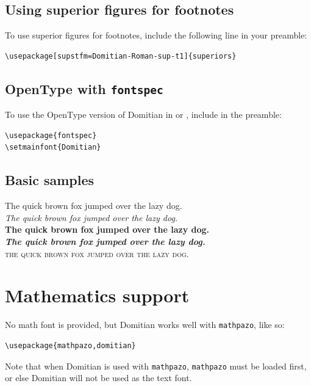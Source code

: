 \documentclass[12pt]{article}
\begin{document}
\subsection{Using superior figures for footnotes}
To use superior figures for footnotes, include the following line in your preamble:

\begin{verbatim}
\usepackage[supstfm=Domitian-Roman-sup-t1]{superiors}
\end{verbatim}

\subsection{OpenType with \texttt{fontspec}}

To use the OpenType version of Domitian in  or , include in the preamble:

\begin{verbatim}
\usepackage{fontspec}
\setmainfont{Domitian}
\end{verbatim}

\subsection{Basic samples}
The quick brown fox jumped over the lazy dog.\\
\textit{The quick brown fox jumped over the lazy dog.}\\
\textbf{The quick brown fox jumped over the lazy dog.}\\
\textbf{\textit{The quick brown fox jumped over the lazy dog.}}\\
\textsc{the quick brown fox jumped over the lazy dog.}\\

\section{Mathematics support}

No math font is provided, but Domitian works well with \texttt{mathpazo}, like so:

\begin{verbatim}
\usepackage{mathpazo,domitian}
\end{verbatim}

Note that when Domitian is used with \texttt{mathpazo}, \texttt{mathpazo} must be loaded first, or else Domitian will not be used as the text font.
\end{document}
